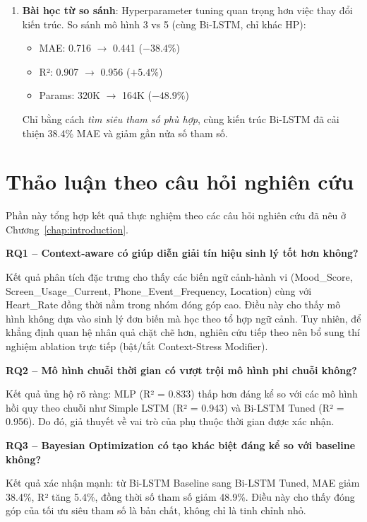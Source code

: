 \begin{enumerate}
    \item \textbf{Bài học từ so sánh}: Hyperparameter tuning quan trọng hơn việc thay đổi kiến trúc. So sánh mô hình 3 vs 5 (cùng Bi-LSTM, chỉ khác HP):
    \begin{itemize}
        \item MAE: 0.716 $\to$ 0.441 ($\mathbf{-38.4\%}$)
        \item R²: 0.907 $\to$ 0.956 ($+5.4\%$)
        \item Params: 320K $\to$ 164K ($-48.9\%$)
    \end{itemize}
    Chỉ bằng cách \textit{tìm siêu tham số phù hợp}, cùng kiến trúc Bi-LSTM đã cải thiện 38.4\% MAE và giảm gần nửa số tham số.
\end{enumerate}


\section{Thảo luận theo câu hỏi nghiên cứu}
\label{sec:rq_discussion}

Phần này tổng hợp kết quả thực nghiệm theo các câu hỏi nghiên cứu đã nêu ở Chương~\ref{chap:introduction}.

\textbf{RQ1 -- Context-aware có giúp diễn giải tín hiệu sinh lý tốt hơn không?}

Kết quả phân tích đặc trưng cho thấy các biến ngữ cảnh-hành vi (Mood\_Score, Screen\_Usage\_Current, Phone\_Event\_Frequency, Location) cùng với Heart\_Rate đồng thời nằm trong nhóm đóng góp cao. Điều này cho thấy mô hình không dựa vào sinh lý đơn biến mà học theo tổ hợp ngữ cảnh. Tuy nhiên, để khẳng định quan hệ nhân quả chặt chẽ hơn, nghiên cứu tiếp theo nên bổ sung thí nghiệm ablation trực tiếp (bật/tắt Context-Stress Modifier).

\textbf{RQ2 -- Mô hình chuỗi thời gian có vượt trội mô hình phi chuỗi không?}

Kết quả ủng hộ rõ ràng: MLP (R² = 0.833) thấp hơn đáng kể so với các mô hình hồi quy theo chuỗi như Simple LSTM (R² = 0.943) và Bi-LSTM Tuned (R² = 0.956). Do đó, giả thuyết về vai trò của phụ thuộc thời gian được xác nhận.

\textbf{RQ3 -- Bayesian Optimization có tạo khác biệt đáng kể so với baseline không?}

Kết quả xác nhận mạnh: từ Bi-LSTM Baseline sang Bi-LSTM Tuned, MAE giảm 38.4\%, R² tăng 5.4\%, đồng thời số tham số giảm 48.9\%. Điều này cho thấy đóng góp của tối ưu siêu tham số là bản chất, không chỉ là tinh chỉnh nhỏ.

